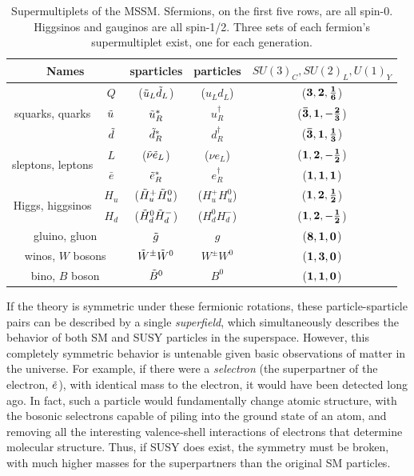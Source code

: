 
\begin{table}
\begin{center}
 \begin{tabular}{cc|c|c|c}
   \hline 
   \multicolumn{2}{c|}{Names} & sparticles & particles & $SU(3)_C, SU(2)_L, U(1)_Y$ \\
   \hline
   \hline
   \multirow{3}{*}{squarks, quarks} & $Q$ 		& ($\squ[L] \sqd[L]$) & ($u_L d_L$) 		& ($\bf{3}, \bf{2}, \frac{1}{6}$) 		\\
   									& $\squ$ 	& $\squ[R]^*$ 		& $u^\dagger_R$ 	& ($\bf{\bar{3}}, \bf{1}, -\frac{2}{3}$) 	\\
   									& $\sqd$ 	& $\sqd[R]^*$ 		& $d^\dagger_R$ 	& ($\bf{\bar{3}}, \bf{1}, \frac{1}{3}$) 	\\		
   \hline
   \multirow{2}{*}{sleptons, leptons} & $L$ 	& ($\slneu \sle[L]$) & ($\nu e_L$) 		& ($\bf{1}, \bf{2}, -\frac{1}{2}$) 		\\
   									& $\bar{e}$ & $\sle[R]^*$ 		& $e^\dagger_R$ 	& ($\bf{1}, \bf{1}, 1$) 					\\
   \hline
   \multirow{2}{*}{Higgs, higgsinos} & $H_u$ 	& ($\Hou[+] \Hou[0]$) 	& ($H^+_u H^0_u$)  & ($\bf{1}, \bf{2}, \frac{1}{2}$) 	\\
   									& $H_d$ 	& ($\Hod[0] \Hod[-]$) 	& ($H^0_d H^-_d$)  & ($\bf{1}, \bf{2}, -\frac{1}{2}$) 	\\  
   \hline
   \multicolumn{2}{c|}{gluino, gluon}	& $\go$ 			& $g$			& ($\bf{8}, \bf{1}, 0$)		\\							
   \hline
   \multicolumn{2}{c|}{winos, $W$ bosons}	& $\Wo^\pm \Wo^0$ 	& $W^\pm W^0$	& ($\bf{1}, \bf{3}, 0$)		\\							
   \hline
   \multicolumn{2}{c|}{bino, $B$ boson}	& $\Bo^0$ 			& $B^0$			& ($\bf{1}, \bf{1}, 0$)		\\							

\hline
\hline
 \end{tabular}
\end{center}
 \caption{Supermultiplets of the \ac{MSSM}. Sfermions, on the first five rows, are all spin-0. Higgsinos and gauginos are all spin-1/2. Three sets of each fermion's supermultiplet exist, one for each generation. \cite{Martin:1997ns}}
 \label{tab:sparticles}
\end{table}


If the theory is symmetric under these fermionic rotations, these particle-sparticle pairs can be described by a single \textit{superfield}, which simultaneously describes the behavior of both \ac{SM} and \ac{SUSY} particles in the superspace. However, this completely symmetric behavior is untenable given basic observations of matter in the universe. For example, if there were a \textit{selectron} (the superpartner of the electron, $\sle$), with identical mass to the electron, it would have been detected long ago. In fact, such a particle would fundamentally change atomic structure, with the bosonic selectrons capable of piling into the ground state of an atom, and removing all the interesting valence-shell interactions of electrons that determine molecular structure. Thus, if \ac{SUSY} does exist, the symmetry must be broken, with much higher masses for the superpartners than the original \ac{SM} particles. 

